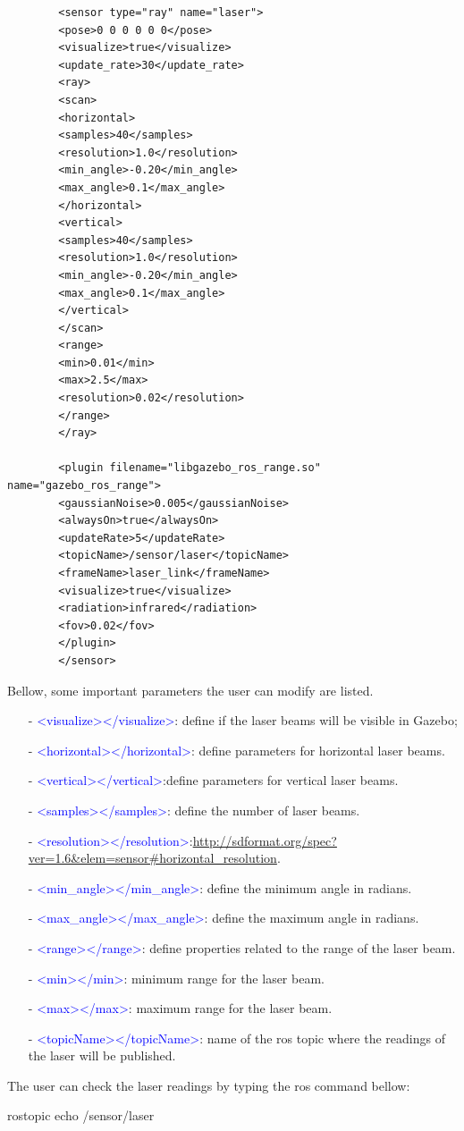 		\begin{verbatim}
		<sensor type="ray" name="laser">
		<pose>0 0 0 0 0 0</pose>
		<visualize>true</visualize>
		<update_rate>30</update_rate>
		<ray>
		<scan>
		<horizontal>
		<samples>40</samples>
		<resolution>1.0</resolution>
		<min_angle>-0.20</min_angle>
		<max_angle>0.1</max_angle>
		</horizontal>
		<vertical>
		<samples>40</samples>
		<resolution>1.0</resolution>
		<min_angle>-0.20</min_angle>
		<max_angle>0.1</max_angle>
		</vertical>
		</scan>
		<range>
		<min>0.01</min>
		<max>2.5</max>
		<resolution>0.02</resolution>
		</range>
		</ray>
		
		<plugin filename="libgazebo_ros_range.so" name="gazebo_ros_range">
		<gaussianNoise>0.005</gaussianNoise>
		<alwaysOn>true</alwaysOn>
		<updateRate>5</updateRate>
		<topicName>/sensor/laser</topicName>
		<frameName>laser_link</frameName>
		<visualize>true</visualize>
		<radiation>infrared</radiation>
		<fov>0.02</fov>
		</plugin>
		</sensor>
		\end{verbatim}
		Bellow, some important parameters the user can modify are listed.
		\begin{itemize}
			\setlength{\itemsep}{1pt}
			\setlength{\parskip}{0pt}
			\setlength{\parsep}{0pt}
			\item[-] \textcolor{blue}{<visualize></visualize>}: define if the laser beams will be visible in Gazebo;
			\item[-] \textcolor{blue}{<horizontal></horizontal>}: define parameters for horizontal laser beams.  
			\item[-] \textcolor{blue}{<vertical></vertical>}:define parameters for vertical laser beams. 
			\item[-] \textcolor{blue}{<samples></samples>}: define the number of laser beams. 
			\item[-] \textcolor{blue}{<resolution></resolution>}:\url{http://sdformat.org/spec?ver=1.6&elem=sensor#horizontal_resolution}. 
			\item[-] \textcolor{blue}{<min\_angle></min\_angle>}: define the minimum angle in radians. 
			\item[-] \textcolor{blue}{<max\_angle></max\_angle>}: define the maximum angle in radians. 
			\item[-] \textcolor{blue}{<range></range>}: define properties related to the range of the laser beam. 
			\item[-] \textcolor{blue}{<min></min>}: minimum range for the laser beam. 
			\item[-] \textcolor{blue}{<max></max>}: maximum range for the laser beam.
			\item[-] \textcolor{blue}{<topicName></topicName>}: name of the ros topic where the readings of the laser will be published.  
		\end{itemize}\normalsize
		The user can check the laser readings by typing the ros command bellow:
		\begin{bashcode}
			rostopic echo /sensor/laser
		\end{bashcode}
		
